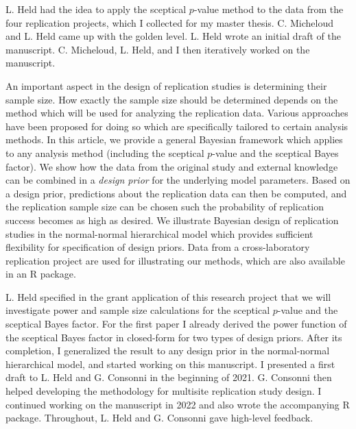 L. Held had the idea to apply the sceptical $p$-value method to the data from
the four replication projects, which I collected for my master thesis. C.
Micheloud and L. Held came up with the golden level. L. Held wrote an initial
draft of the manuscript. C. Micheloud, L. Held, and I then iteratively worked on
the manuscript.


An important aspect in the design of replication studies is determining their
sample size. How exactly the sample size should be determined depends on the
method which will be used for analyzing the replication data. Various approaches
have been proposed for doing so which are specifically tailored to certain
analysis methods. In this article, we provide a general Bayesian framework which
applies to any analysis method (including the sceptical $p$-value and the
sceptical Bayes factor). We show how the data from the original study and
external knowledge can be combined in a \emph{design prior} for the underlying
model parameters. Based on a design prior, predictions about the replication
data can then be computed, and the replication sample size can be chosen such
the probability of replication success becomes as high as desired. We illustrate
Bayesian design of replication studies in the normal-normal hierarchical model
which provides sufficient flexibility for specification of design priors. Data
from a cross-laboratory replication project are used for illustrating our
methods, which are also available in an R package.

L. Held specified in the grant application of this research project
\citep{Heldproposal2019} that we will investigate power and sample size
calculations for the sceptical $p$-value and the sceptical Bayes factor. For the
first paper I already derived the power function of the sceptical Bayes factor
in closed-form for two types of design priors. After its completion, I
generalized the result to any design prior in the normal-normal hierarchical
model, and started working on this manuscript. I presented a first draft to L.
Held and G. Consonni in the beginning of 2021. G. Consonni then helped
developing the methodology for multisite replication study design. I continued
working on the manuscript in 2022 and also wrote the accompanying R package.
Throughout, L. Held and G. Consonni gave high-level feedback.


